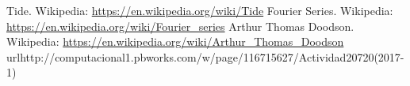 \documentclass[12pt,letterpaper]{article}
\begin{document}
\begin{thebibliography}{2}

 Tide. Wikipedia: \url{https://en.wikipedia.org/wiki/Tide}
 Fourier Series. Wikipedia: \url{https://en.wikipedia.org/wiki/Fourier_series}
 Arthur Thomas Doodson. Wikipedia: \url{https://en.wikipedia.org/wiki/Arthur_Thomas_Doodson}
 url{http://computacional1.pbworks.com/w/page/116715627/Actividad20720(2017-1)}

\end{thebibliography}
\end{document}
